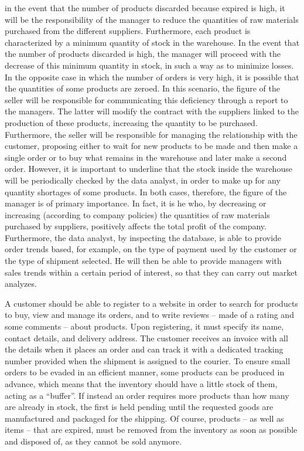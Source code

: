 in the event that the number of products discarded because expired is high, it will be the responsibility of the manager to reduce the quantities of raw materials
purchased from the different suppliers. Furthermore, each product is characterized by a minimum quantity of stock in the warehouse. In the event that the number of
products discarded is high, the manager will proceed with the decrease of this minimum quantity in stock, in such a way as to minimize losses.
In the opposite case in which the number of orders is very high, it is possible that the quantities of some products are zeroed. In this scenario, the figure of
the seller will be responsible for communicating this deficiency through a report to the managers. The latter will modify the contract with the suppliers linked
to the production of these products, increasing the quantity to be purchased. Furthermore, the seller will be responsible for managing the relationship with the customer,
proposing either to wait for new products to be made and then make a single order or to buy what remains in the warehouse and later make a second order.
However, it is important to underline that the stock inside the warehouse will be periodically checked by the data analyst, in order to make up for any quantity
shortages of some products.
In both cases, therefore, the figure of the manager is of primary importance. In fact, it is he who, by decreasing or increasing (according to company policies)
the quantities of raw materials purchased by suppliers, positively affects the total profit of the company.
Furthermore, the data analyst, by inspecting the database, is able to provide order trends based, for example, on the type of payment used by the customer or
the type of shipment selected. He will then be able to provide managers with sales trends within a certain period of interest, so that they can carry out market analyzes.

A customer should be able to register to a website in order to search for products to buy, view and manage its orders, and to write reviews -- made of a rating and
some comments -- about products. Upon registering, it must specify its name, contact details, and delivery address. The customer receives an invoice with all the
details when it places an order and can track it with a dedicated tracking number provided when the shipment is assigned to the courier. To ensure small orders to
be evaded in an efficient manner, some products can be produced in advance, which means that the inventory should have a little stock of them, acting as a ``buffer''.
If instead an order requires more products than how many are already in stock, the first is held pending until the requested goods are manufactured and packaged for
the shipping. Of course, products -- as well as items -- that are expired, must be removed from the inventory as soon as possible and disposed of, as they cannot be
sold anymore.


